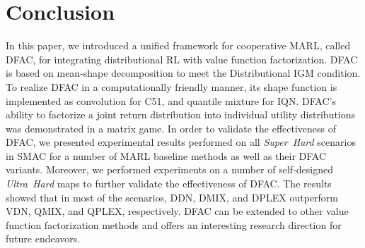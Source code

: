 \documentclass[twoside,11pt]{article}
\newcommand{\superhard}{\textit{Super~Hard}}
\newcommand{\ultrahard}{\textit{Ultra~Hard}}
\newcommand{\ddn}{DDN}
\newcommand{\dmix}{DMIX}
\newcommand{\dplex}{DPLEX}
\begin{document}
  \section{Conclusion}
\label{sec:conclusion}

In this paper, we introduced a unified framework for cooperative MARL, called DFAC, for integrating distributional RL with value function factorization. DFAC is based on mean-shape decomposition to meet the Distributional IGM condition.
To realize DFAC in a computationally friendly manner, its shape function is implemented as convolution for C51, and quantile mixture for IQN.
DFAC's ability to factorize a joint return distribution into individual utility distributions was demonstrated in a matrix game. In order to validate the effectiveness of DFAC, we presented experimental results performed on all \superhard{} scenarios in SMAC for a number of MARL baseline methods as well as their DFAC variants. Moreover, we performed experiments on a number of self-designed \ultrahard{} maps to further validate the effectiveness of DFAC. The results showed that in most of the scenarios, \ddn{}, \dmix{}, and \dplex{} outperform VDN, QMIX, and QPLEX, respectively. DFAC can be extended to other value function factorization methods and offers an interesting research direction for future endeavors.

\newpage
  
\vskip 0.2in

\end{document}
